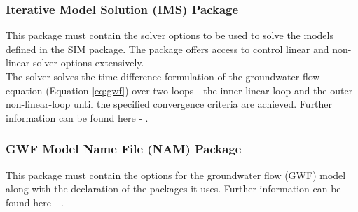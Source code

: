\subsubsection*{Iterative Model Solution (IMS) Package}
This package must contain the solver options to be used to solve the models defined in the SIM package. The package offers access to control linear and non-linear solver options extensively.
\\
The solver solves the time-difference formulation of the groundwater flow equation (Equation \ref{eq:gwf}) over two loops - the inner linear-loop and the outer non-linear-loop until the specified convergence criteria are achieved.
Further information can be found here - \cite[p.~210]{USGS2018}.

\subsubsection*{GWF Model Name File (NAM) Package}
This package must contain the options for the groundwater flow (GWF) model along with the declaration of the packages it uses.
Further information can be found here - \cite[p.~24]{USGS2018}.

